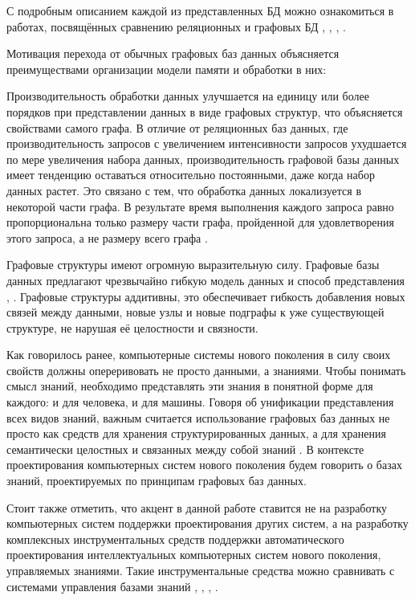 С подробным описанием каждой из представленных БД можно ознакомиться в работах, посвящённых сравнению  реляционных и графовых БД , \cite{vicknair2010comparison}, , .

Мотивация перехода от обычных графовых баз данных объясняется преимуществами организации модели памяти и обработки в них:
\begin{textitemize}
    \item Производительность обработки данных улучшается на единицу или более порядков при представлении данных в виде графовых структур, что объясняется свойствами самого графа. В отличие от реляционных баз данных, где производительность запросов с увеличением интенсивности запросов ухудшается по мере увеличения набора данных, производительность графовой базы данных имеет тенденцию оставаться относительно постоянными, даже когда набор данных растет. Это связано с тем, что обработка данных локализуется в некоторой части графа. В результате время выполнения каждого запроса равно пропорциональна только размеру части графа, пройденной для удовлетворения этого запроса, а не размеру всего графа \cite{Khasahmadi2020Memory-Based}.
    \item Графовые структуры имеют огромную выразительную силу. Графовые базы данных предлагают чрезвычайно гибкую модель данных и способ представления \cite{Diskrete_Math}, \cite{Reinhard}. Графовые структуры аддитивны, это обеспечивает гибкость добавления новых связей между данными, новые узлы и новые подграфы к уже существующей структуре, не нарушая её целостности и связности.
\end{textitemize}

Как говорилось ранее, компьютерные системы нового поколения в силу своих свойств должны опереривовать не просто данными, а знаниями. Чтобы понимать смысл знаний, необходимо представлять эти знания в понятной форме для каждого: и для человека, и для машины. Говоря об унификации представления всех видов знаний, важным считается использование графовых баз данных не просто как средств для хранения структурированных данных, а для хранения семантически целостных и связанных между собой знаний \cite{SenKB2017}. В контексте проектирования компьютерных систем нового поколения будем говорить о базах знаний, проектируемых по принципам графовых баз данных.

Стоит также отметить, что акцент в данной работе ставится не на разработку компьютерных систем поддержки проектирования других систем, а на разработку комплексных инструментальных средств поддержки автоматического проектирования интеллектуальных компьютерных систем нового поколения, управляемых знаниями. Такие инструментальные средства можно сравнивать с системами управления базами знаний , \cite{Gavrilova2000}, , .

